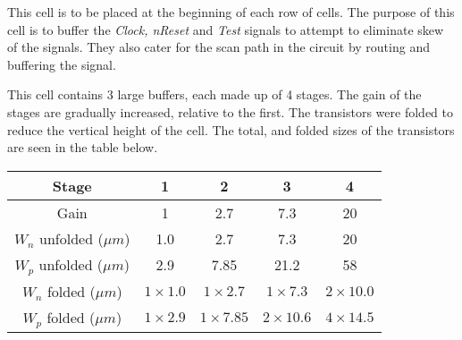 
This cell is to be placed at the beginning of each row of cells. 
The purpose of this cell is to buffer the \textit{Clock, nReset} and \textit{Test} signals to attempt to eliminate skew of the signals.
They also cater for the scan path in the circuit by routing and buffering the signal.

This cell contains 3 large buffers, each made up of 4 stages.
The gain of the stages are gradually increased, relative to the first. 
The transistors were folded to reduce the vertical height of the cell. 
The total, and folded sizes of the transistors are seen in the table below.

\begin{table}[htb!]
\centering
\begin{tabular}{c|cccc}
Stage						&	1				&	2		&	3		&	4 \\ \hline
Gain 						& 	1 				& 	2.7 	& 	7.3 	& 	20 \\
$W_n$ unfolded 	($\mu m$) 	&	1.0 			& 	2.7 	& 	7.3 	& 	20 \\
$W_p$ unfolded	($\mu m$)	& 	2.9				& 	7.85 	& 	21.2 	& 	58 \\
$W_n$ folded	($\mu m$)	&	$1 \times 1.0$ 	& 	$1 \times 2.7$ 		& 	$1 \times 7.3$ 		& 	$2 \times 10.0$ \\
$W_p$ folded	($\mu m$)	&	$1 \times 2.9$ 	& 	$1 \times 7.85$ 	& 	$2 \times 10.6$ 	& 	$4 \times 14.5$ \\
\end{tabular}
\end{table}

